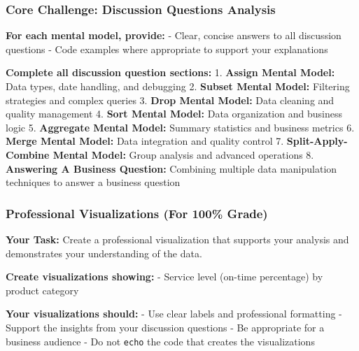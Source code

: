 \documentclass[
  letterpaper,
  DIV=11,
  numbers=noendperiod]{scrartcl}
\begin{document}
\subsubsection{Core Challenge: Discussion Questions
Analysis}\label{core-challenge-discussion-questions-analysis}

\textbf{For each mental model, provide:} - Clear, concise answers to all
discussion questions - Code examples where appropriate to support your
explanations

\begin{tcolorbox}[enhanced jigsaw, colbacktitle=quarto-callout-important-color!10!white, opacitybacktitle=0.6, colframe=quarto-callout-important-color-frame, coltitle=black, left=2mm, titlerule=0mm, title=\textcolor{quarto-callout-important-color}{\faExclamation}\hspace{0.5em}{📊 Discussion Questions Requirements}, bottomtitle=1mm, opacityback=0, arc=.35mm, rightrule=.15mm, colback=white, breakable, bottomrule=.15mm, toprule=.15mm, toptitle=1mm, leftrule=.75mm]

\textbf{Complete all discussion question sections:} 1. \textbf{Assign
Mental Model:} Data types, date handling, and debugging 2.
\textbf{Subset Mental Model:} Filtering strategies and complex queries
3. \textbf{Drop Mental Model:} Data cleaning and quality management 4.
\textbf{Sort Mental Model:} Data organization and business logic 5.
\textbf{Aggregate Mental Model:} Summary statistics and business metrics
6. \textbf{Merge Mental Model:} Data integration and quality control 7.
\textbf{Split-Apply-Combine Mental Model:} Group analysis and advanced
operations 8. \textbf{Answering A Business Question:} Combining multiple
data manipulation techniques to answer a business question

\end{tcolorbox}

\subsubsection{Professional Visualizations (For 100\%
Grade)}\label{professional-visualizations-for-100-grade}

\textbf{Your Task:} Create a professional visualization that supports
your analysis and demonstrates your understanding of the data.

\textbf{Create visualizations showing:} - Service level (on-time
percentage) by product category

\textbf{Your visualizations should:} - Use clear labels and professional
formatting - Support the insights from your discussion questions - Be
appropriate for a business audience - Do not \texttt{echo} the code that
creates the visualizations
\end{document}

